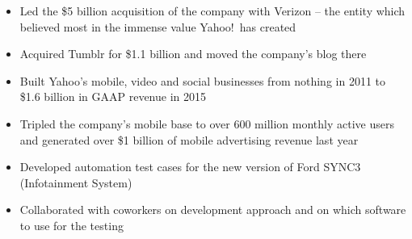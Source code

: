 \documentclass[8pt,a4paper]{altacv}
\begin{document}


\begin{fullwidth}
\makecvheader
\end{fullwidth}



\begin{itemize}
\item Led the \$5 billion acquisition of the company with Verizon -- the entity which believed most in the immense value Yahoo!\ has created
\item Acquired Tumblr for \$1.1 billion and moved the company's blog there
\item Built Yahoo's mobile, video and social businesses from nothing in 2011 to \$1.6 billion in GAAP revenue in 2015
\item Tripled the company's mobile base to over 600 million monthly active users and generated over \$1 billion of mobile advertising revenue last year
\end{itemize}
\divider

\begin{itemize}
\item Developed automation test cases for the new version of Ford SYNC3 (Infotainment System)
\item Collaborated with coworkers on development approach and on which software to use for the testing
\end{itemize}
\divider
\end{document}
